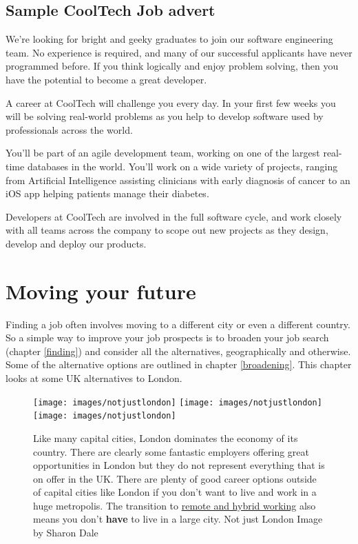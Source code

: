 \documentclass[
]{book}
\begin{document}
\hypertarget{cooltech}{%
\section{Sample CoolTech Job advert}\label{cooltech}}

We're looking for bright and geeky graduates to join our software engineering team. No experience is required, and many of our successful applicants have never programmed before. If you think logically and enjoy problem solving, then you have the potential to become a great developer.

A career at CoolTech will challenge you every day. In your first few weeks you will be solving real-world problems as you help to develop software used by professionals across the world.

You'll be part of an agile development team, working on one of the largest real-time databases in the world. You'll work on a wide variety of projects, ranging from Artificial Intelligence assisting clinicians with early diagnosis of cancer to an iOS app helping patients manage their diabetes.

Developers at CoolTech are involved in the full software cycle, and work closely with all teams across the company to scope out new projects as they design, develop and deploy our products.

\hypertarget{moving}{%
\chapter{Moving your future}\label{moving}}

Finding a job often involves moving to a different city or even a different country. So a simple way to improve your job prospects is to broaden your job search (chapter \ref{finding}) and consider all the alternatives, geographically and otherwise. Some of the alternative options are outlined in chapter \ref{broadening}. This chapter looks at some UK alternatives to London.

\begin{figure}
\texttt{[image: images/notjustlondon]} \texttt{[image: images/notjustlondon]} \texttt{[image: images/notjustlondon]} \caption{Like many capital cities, London dominates the economy of its country. There are clearly some fantastic employers offering great opportunities in London but they do not represent everything that is on offer in the UK. There are plenty of good career options outside of capital cities like London if you don't want to live and work in a huge metropolis. The transition to \href{https://en.wikipedia.org/wiki/Remote_work}{remote and hybrid working} also means you don't \textbf{have} to live in a large city. Not just London Image by Sharon Dale \citep{notjustlondon}}\label{fig:northern-fig}
\end{figure}
\end{document}
